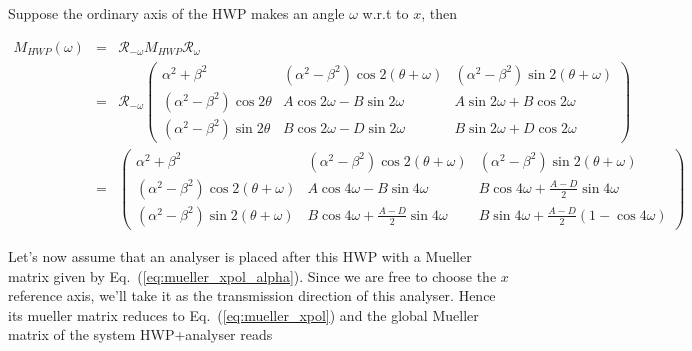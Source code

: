 \documentclass[a4paper,10pt]{article}
\begin{document}
Suppose the ordinary axis of the HWP makes an angle $\omega$ w.r.t to $x$, then

\begin{eqnarray}
M_{HWP}(\omega) &=& \mathcal{R_{-\omega}}M_{HWP}\mathcal{R_{\omega}} \nonumber\\
&=&\mathcal{R_{-\omega}}
\left(\begin{array}{lll}
\alpha^2+\beta^2 & (\alpha^2-\beta^2)\cos2(\theta+\omega) &
(\alpha^2-\beta^2)\sin2(\theta+\omega) \\
(\alpha^2-\beta^2)\cos2\theta & A\cos2\omega-B\sin2\omega & A\sin2\omega +
B\cos2\omega\\
(\alpha^2-\beta^2)\sin2\theta & B\cos2\omega - D\sin2\omega &
B\sin2\omega+D\cos2\omega\end{array}\right) \nonumber\\
&=&\left(\begin{array}{lll}
\alpha^2+\beta^2 & (\alpha^2-\beta^2)\cos2(\theta+\omega) &
(\alpha^2-\beta^2)\sin2(\theta+\omega) \\
(\alpha^2-\beta^2)\cos2(\theta+\omega) & 
A\cos4\omega-B\sin4\omega & B\cos4\omega + \frac{A-D}{2}\sin4\omega \\
(\alpha^2-\beta^2)\sin2(\theta+\omega) & B\cos4\omega +\frac{A-D}{2}\sin4\omega &
 B\sin4\omega+\frac{A-D}{2}(1-\cos4\omega)
\end{array}\right)
\end{eqnarray}

Let's now assume that an analyser is placed after this HWP with a Mueller matrix
given by Eq.~(\ref{eq:mueller_xpol_alpha}). Since we are free to choose the $x$
reference axis, we'll take it as the transmission direction of this
analyser. Hence its mueller matrix reduces to Eq.~(\ref{eq:mueller_xpol}) and
the global Mueller matrix of the system HWP+analyser reads
\end{document}
